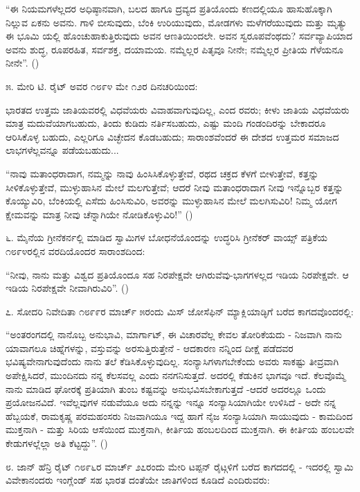 “ಈ ನಿಯಮಗಳೆಲ್ಲದರ ಅಧಿಷ್ಠಾನವಾಗಿ, ಬಲದ ಹಾಗೂ ದ್ರವ್ಯದ ಪ್ರತಿಯೊಂದು ಕಣದಲ್ಲಿಯೂ ಹಾಸುಹೊಕ್ಕಾಗಿ ನಿಲ್ಲುವ ಏಕನು ಅವನು. ಗಾಳಿ ಬೀಸುವುದು, ಬೆಂಕಿ ಉರಿಯುವುದು, ಮೋಡಗಳು ಮಳೆಗರೆಯುವುದು ಮತ್ತು ಮೃತ್ಯು ಈ ಭೂಮಿ ಯಲ್ಲಿ ಹೊಂಚುಹಾಕುತ್ತಿರುವುದು ಅವನ ಆಣತಿಯಿಂದಲೇ. ಅವನ ಸ್ವರೂಪವೆಂಥದು? ಸರ್ವವ್ಯಾಪಿಯಾದ ಅವನು ಶುದ್ಧ, ರೂಪರಹಿತ, ಸರ್ವಶಕ್ತ, ದಯಾಮಯ. ನಮ್ಮೆಲ್ಲರ ಪಿತೃವೂ ನೀನೇ; ನಮ್ಮೆಲ್ಲರ ಪ್ರೀತಿಯ ಗೆಳೆಯನೂ ನೀನೇ”. ()

೫. ಮೇರಿ ಟಿ. ರೈಟ್ ಅವರ ೧೮೯೪ ಮೇ ೧೨ರ ದಿನಚರಿಯಿಂದ:

ಭಾರತದ ಉತ್ತಮ ಜಾತಿಯವರಲ್ಲಿ ವಿಧವೆಯರು ವಿವಾಹವಾಗುವುದಿಲ್ಲ, ಎಂದ ರವರು; ಕೀಳು ಜಾತಿಯ ವಿಧವೆಯರು ಮಾತ್ರ ಮದುವೆಯಾಗಬಹುದು, ತಿಂದು ಕುಡಿದು ನರ್ತಿಸಬಹುದು, ಎಷ್ಟು ಮಂದಿ ಗಂಡಂದಿರನ್ನು ಬೇಕಾದರೂ ಆರಿಸಿಕೊಳ್ಳ ಬಹುದು, ಎಲ್ಲರಿಗೂ ವಿಚ್ಛೇದನ ಕೊಡಬಹುದು; ಸಾರಾಂಶವೆಂದರೆ ಈ ದೇಶದ ಉತ್ತಮರ ಸಮಾಜದ ಲಾಭಗಳೆಲ್ಲವನ್ನೂ ಪಡೆಯಬಹುದು...

“ನಾವು ಮತಾಂಧರಾದಾಗ, ನಮ್ಮನ್ನು ನಾವು ಹಿಂಸಿಸಿಕೊಳ್ಳುತ್ತೇವೆ, ರಥದ ಚಕ್ರದ ಕೆಳಗೆ ಬೀಳುತ್ತೇವೆ, ಕತ್ತನ್ನು ಸೀಳಿಕೊಳ್ಳುತ್ತೇವೆ, ಮುಳ್ಳುಹಾಸಿನ ಮೇಲೆ ಮಲಗುತ್ತೇವೆ; ಆದರೆ ನೀವು ಮತಾಂಧರಾದಾಗ ನೀವು ಇನ್ನೊಬ್ಬರ ಕತ್ತನ್ನು ಕೊಯ್ಯುವಿರಿ, ಬೆಂಕಿಯಲ್ಲಿ ಎಸೆದು ಹಿಂಸಿಸುವಿರಿ, ಅವರನ್ನು ಮುಳ್ಳುಹಾಸಿನ ಮೇಲೆ ಮಲಗಿಸುವಿರಿ! ನಿಮ್ಮ ಯೋಗ ಕ್ಷೇಮವನ್ನು ಮಾತ್ರ ನೀವು ಚೆನ್ನಾಗಿಯೇ ನೋಡಿಕೊಳ್ಳುವಿರಿ!” ()

೬. ಮೈನೆಯ ಗ್ರೀನೆಕರ್ನಲ್ಲಿ ಮಾಡಿದ ಸ್ವಾಮಿಗಳ ಬೋಧನೆಯೊಂದನ್ನು ಉದ್ಧರಿಸಿ ಗ್ರೀನೆಕರ್ ವಾಯ್ಸ್ ಪತ್ರಿಕೆಯ ೧೮೯೪ರಲ್ಲಿನ ವರದಿಯೊಂದರ ಸಾರಾಂಶದಿಂದ:

“ನೀವು, ನಾನು ಮತ್ತು ವಿಶ್ವದ ಪ್ರತಿಯೊಂದೂ ಸಹ ನಿರಪೇಕ್ಷವೇ ಆಗಿರುವೆವು-ಭಾಗಗಳಲ್ಲದ ಇಡಿಯ ನಿರಪೇಕ್ಷವೇ. ಆ ಇಡಿಯ ನಿರಪೇಕ್ಷವೇ ನೀವಾಗಿರುವಿರಿ”. ()

೭. ಸೋದರಿ ನಿವೇದಿತಾ ೧೮೯೯ರ ಮಾರ್ಚ್ ೫ರಂದು ಮಿಸ್ ಜೋಸೆಫಿನ್ ಮ್ಯಾಕ್ಲಿಯಾಡ್ಳಿಗೆ ಬರೆದ ಕಾಗದವೊಂದರಲ್ಲಿ:

“ಅಂತರಂಗದಲ್ಲಿ ನಾನೊಬ್ಬ ಅನುಭಾವಿ, ಮಾರ್ಗಾಟ್, ಈ ವಿಚಾರವೆಲ್ಲ ಕೇವಲ ತೋರಿಕೆಯದು - ನಿಜವಾಗಿ ನಾನು ಯಾವಾಗಲೂ ಚಿಹ್ನೆಗಳನ್ನು, ವಸ್ತುವನ್ನು ಅರಸುತ್ತಿರುತ್ತೇನೆ - ಆದಕಾರಣ ನನ್ನಿಂದ ದೀಕ್ಷೆ ಪಡೆದವರ ಭವಿಷ್ಯವೇನಾಗುವುದೆಂದು ನಾನು ತಲೆ ಕೆಡಿಸಿಕೊಳ್ಳುವುದಿಲ್ಲ. ಸಂನ್ಯಾಸಿಗಳಾಗಬೇಕೆಂದು ಅವರು ಸಾಕಷ್ಟು ತೀವ್ರವಾಗಿ ಅಪೇಕ್ಷಿಸಿದರೆ, ಮುಂದಿನದು ನನ್ನ ಕೆಲಸವಲ್ಲ ಎಂದು ನನಗನಿಸುತ್ತದೆ. ಅದರಲ್ಲಿ ಕೆಡುಕಿನ ಭಾಗವೂ ಇದೆ. ಕೆಲವೊಮ್ಮೆ ನಾನು ಮಾಡಿದ ಘೋರಕ್ಕೆ ಪ್ರತಿಯಾಗಿ ತುಂಬ ಕಷ್ಟವನ್ನು ಅನುಭವಿಸಬೇಕಾಗುತ್ತದೆ -ಆದರೆ ಅದರಲ್ಲೂ ಒಂದು ಪ್ರಯೋಜನವಿದೆ. ಇವೆಲ್ಲವುಗಳ ನಡುವೆಯೂ ಅದು ನನ್ನನ್ನು ಇನ್ನೂ ಸಂನ್ಯಾಸಿಯಾಗಿಯೇ ಉಳಿಸಿದೆ - ಅದೇ ನನ್ನ ಹೆಬ್ಬಯಕೆ, ರಾಮಕೃಷ್ಣ ಪರಮಹಂಸರು ನಿಜವಾಗಿಯೂ ಇದ್ದ ಹಾಗೆ ನೈಜ ಸಂನ್ಯಾಸಿಯಾಗಿ ಸಾಯುವುದು - ಕಾಮದಿಂದ ಮುಕ್ತನಾಗಿ - ಮತ್ತು ಸಿರಿಯ ಆಸೆಯಿಂದ ಮುಕ್ತನಾಗಿ, ಕೀರ್ತಿಯ ಹಂಬಲದಿಂದ ಮುಕ್ತನಾಗಿ. ಈ ಕೀರ್ತಿಯ ಹಂಬಲವೇ ಕೇಡುಗಳಲ್ಲೆಲ್ಲಾ ಅತಿ ಕೆಟ್ಟದ್ದು”. ()

೮. ಜಾನ್ ಹೆನ್ರಿ ರೈಟ್ ೧೮೯೬ರ ಮಾರ್ಚ್ ೨೭ರಂದು ಮೇರಿ ಟಪ್ಪನ್ ರೈಟ್ಗಳಿಗೆ ಬರೆದ ಕಾಗದದಲ್ಲಿ - ಇದರಲ್ಲಿ ಸ್ವಾಮಿ ವಿವೇಕಾನಂದರು ಇಂಗ್ಲೆಂಡ್ ಸಹ ಭಾರತ ದಂತೆಯೇ ಜಾತಿಗಳಿಂದ ಕೂಡಿದೆ ಎಂದಿರುವರು:

